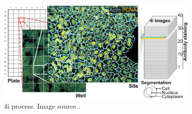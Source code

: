 \begin{figure}[htb]
  \centering
  \includegraphics[width=100mm]{./Sections/Images/plate-well.png}
  \caption{\Acrlong{4i} process. Image source \cite{Guteaar7042}.}
  \label{fig:4i}
\end{figure}
